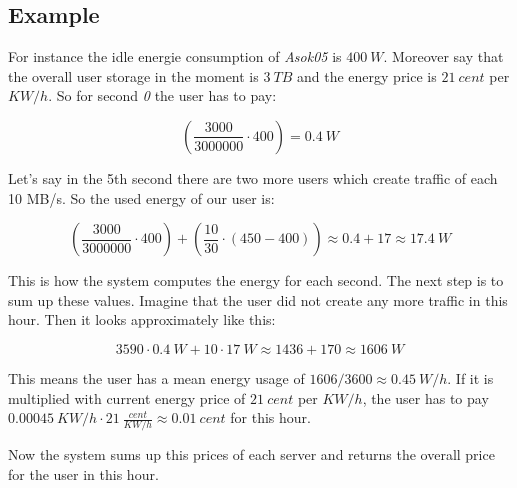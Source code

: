   \subsection{Example}
     For instance the idle energie consumption of \textit{Asok05} is $400\ W$. Moreover say that the overall user storage in the moment is $3\ TB$ and the energy price is $21\ cent$ per $KW/h$. So for second \textit{0} the user has to pay:
    
    $$(\frac{3000}{3000000} \cdot 400) = 0.4\ W $$
    
    Let's say in the 5th second there are two more users which create traffic of each 10 MB/s. So the used energy of our user is:
    
     $$(\frac{3000}{3000000} \cdot 400) + (\frac{10}{30} \cdot (450 - 400))  \approx 0.4 + 17 \approx 17.4\ W $$
           
  	This is how the system computes the energy for each second. The next step is to sum up these values. Imagine that the user did not create any more traffic in this hour. Then it looks approximately like this:
  	
  	$$ 3590 \cdot 0.4\ W + 10 \cdot 17\ W \approx 1436 + 170 \approx 1606\ W$$
  	
  	This means the user has a mean energy usage of $1606 / 3600 \approx 0.45\ W/h$. If it is multiplied with current energy price of $21\ cent$ per $KW/h$, the user has to pay $ 0.00045\ KW/h \cdot 21\ \frac{cent}{KW/h} \approx 0.01\ cent$ for this hour.
  	
  	Now the system sums up this prices of each server and returns the overall price for the user in this hour.  